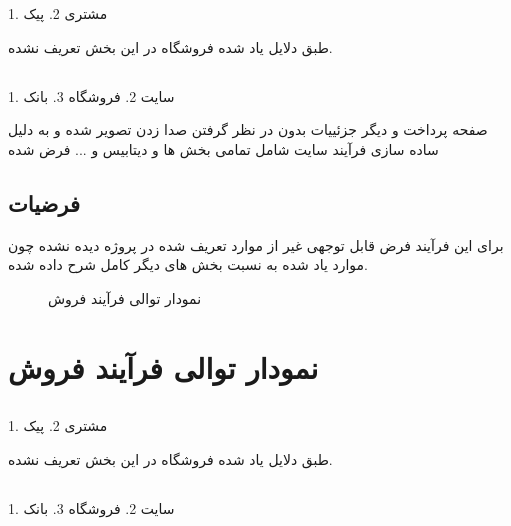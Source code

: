 \documentclass[12pt,onecolumn,a4paper]{article}
\begin{document}
1. مشتری
2. پیک

طبق دلایل یاد شده فروشگاه در این بخش تعریف نشده.
\subsection{ }
1. سایت
2. فروشگاه
3. بانک

صفحه پرداخت و دیگر جزئییات بدون در نظر گرفتن صدا زدن  تصویر شده و به دلیل ساده سازی فرآیند سایت شامل تمامی بخش ها و دیتابیس و ... فرض شده

\subsection{فرضیات }
برای این فرآیند فرض قابل توجهی غیر از موارد تعریف شده در پروژه دیده نشده چون موارد یاد شده به نسبت بخش های دیگر کامل شرح داده شده.

\newpage
\begin{figure}[!h]
\caption{نمودار توالی فرآیند فروش}\label{sellpng}
\end{figure}


\section{نمودار توالی فرآیند فروش}
\subsection{ }

1. مشتری
2. پیک

طبق دلایل یاد شده فروشگاه در این بخش تعریف نشده.
\subsection{ }
1. سایت
2. فروشگاه
3. بانک
\end{document}
